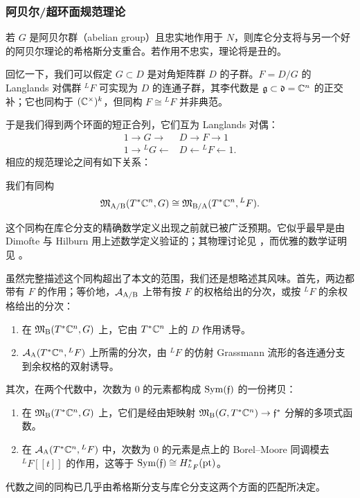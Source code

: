 \subsubsection{阿贝尔/超环面规范理论}

若 $G$ 是阿贝尔群（abelian group）且忠实地作用于 $N$，则库仑分支将与另一个好的阿贝尔理论的希格斯分支重合。若作用不忠实，理论将是丑的。

回忆一下，我们可以假定 $G\subset D$ 是对角矩阵群 $D$ 的子群。$F=D/G$ 的 Langlands 对偶群 ${}^LF$ 可实现为 $D$ 的连通子群，其李代数是 $\mathfrak{g}\subset \mathfrak{d}=\mathbb{C}^n$ 的正交补；它也同构于 $(\mathbb{C}^{\times})^k$，但同构 $F\cong {}^LF$ 并非典范。

于是我们得到两个环面的短正合列，它们互为 Langlands 对偶：
\begin{align*}
	1\to G\to & D \to F \to 1\\
	1\to {}^LG\leftarrow & D\leftarrow {}^L F \leftarrow 1.
\end{align*}
相应的规范理论之间有如下关系：
\begin{theorem}
  我们有同构
\[ \mathfrak{M}_{\operatorname{A/B}}(T^*\mathbb{C}^n,G)\cong \mathfrak{M}_{\operatorname{B/A}}(T^*\mathbb{C}^n,{}^LF). \]
\end{theorem}
这个同构在库仑分支的精确数学定义出现之前就已被广泛预期。它似乎最早是由 Dimofte 与 Hilburn 用上述数学定义验证的；其物理讨论见 \cite[\S 3.3]{bullimoreCoulombBranch2017}，而优雅的数学证明见 \cite[\S 4(vii)]{BFN}。

虽然完整描述这个同构超出了本文的范围，我们还是想略述其风味。首先，两边都带有 $F$ 的作用；等价地，$\mathcal{A}_{\operatorname{A/B}}$ 上带有按 $F$ 的权格给出的分次，或按 ${}^LF$ 的余权格给出的分次：
\begin{enumerate}
	\item 在 $\mathfrak{M}_{\operatorname{B}}(T^*\mathbb{C}^n,G)$ 上，它由 $T^*\mathbb{C}^n$ 上的 $D$ 作用诱导。
	\item $\mathcal{A}_{\operatorname{A}}(T^*\mathbb{C}^n,{}^LF)$ 上所需的分次，由 ${}^LF$ 的仿射 Grassmann 流形的各连通分支到余权格的双射诱导。
\end{enumerate}
其次，在两个代数中，次数为 $0$ 的元素都构成 $\operatorname{Sym}(\mathfrak{f})$ 的一份拷贝：
\begin{enumerate}
	\item 在 $\mathfrak{M}_{\operatorname{B}}(T^*\mathbb{C}^n,G)$ 上，它们是经由矩映射 $\mathfrak{M}_{\operatorname{B}}(G,T^*\mathbb{C}^n)\to \mathfrak{f}^*$ 分解的多项式函数。
	\item 在 $\mathcal{A}_{\operatorname{A}}(T^*\mathbb{C}^n,{}^LF)$ 中，次数为 $0$ 的元素是点上的 Borel--Moore 同调模去 ${}^LF[[t]]$ 的作用，这等于 $\operatorname{Sym}(\mathfrak{f})\cong H^*_{{}^LF}(\operatorname{pt})$。
\end{enumerate}
代数之间的同构已几乎由希格斯分支与库仑分支这两个方面的匹配所决定。


